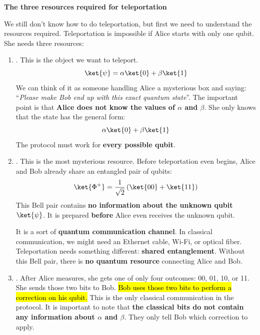\begin{flushleft}
    \textcolor{Green3}{ \textbf{The three resources required for teleportation}}
\end{flushleft}
We still don't know how to do teleportation, but first we need to understand the resources required. Teleportation is impossible if Alice starts with only one qubit. She needs three resources:
\begin{enumerate}
    \item {}. This is the object we want to teleport.
    \begin{equation*}
        \ket{\psi} = \alpha\ket{0} + \beta\ket{1}
    \end{equation*}
    We can think of it as someone handling Alice a mysterious box and saying: ``\emph{Please make Bob end up with this exact quantum state}''. The important point is that \textbf{Alice does not know the values of $\alpha$ and $\beta$}. She only knows that the state has the general form:
    \begin{equation*}
        \alpha\ket{0} + \beta\ket{1}
    \end{equation*}
    The protocol must work for \textbf{every possible qubit}.


    \item {}. This is the most mysterious resource. Before teleportation even begins, Alice and Bob already share an entangled pair of qubits:
    \begin{equation*}
        \ket{\Phi^+} = \frac{1}{\sqrt{2}}\left(\ket{00} + \ket{11}\right)
    \end{equation*}
    This Bell pair contains \textbf{no information about the unknown qubit $\ket{\psi}$}. It is prepared \textbf{before} Alice even receives the unknown qubit.

    It is a sort of \textbf{quantum communication channel}. In classical communication, we might need an Ethernet cable, Wi-Fi, or optical fiber. Teleportation needs something different: \textbf{shared entanglement}. Without this Bell pair, there is \textbf{no quantum resource} connecting Alice and Bob.
    
    
    \item {}. After Alice measures, she gets one of only four outcomes: 00, 01, 10, or 11. She sends those two bits to Bob. \hl{Bob uses those two bits to perform a correction on his qubit.} This is the only classical communication in the protocol. It is important to note that \textbf{the classical bits do not contain any information about $\alpha$ and $\beta$}. They only tell Bob which correction to apply.
\end{enumerate}

